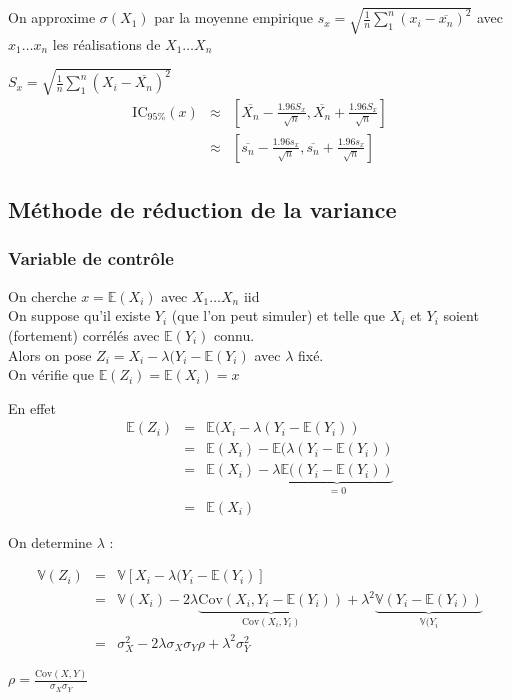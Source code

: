 \documentclass{report}
\newcommand{\Var}{\mathbb{V}}
\newcommand{\Cov}{\mathrm{Cov}}
\begin{document}
On approxime $\sigma(X_1)$ par la moyenne empirique $s_x = \sqrt{\displaystyle\frac{1}{n}\displaystyle\sum^n_1(x_i-\overline{x_n})^2}$ avec $x_1\dots x_n$ les réalisations de $X_1\dots X_n$

$S_x = \sqrt{\displaystyle\frac{1}{n}\displaystyle\sum^n_1(X_i-\overline{X_n})^2}$
\begin{eqnarray}
\mbox{IC}_{95\%}(x) &\approx& \left[\overline{X_n}-\displaystyle\frac{1.96S_x}{\sqrt{n}},\overline{X_n}+\displaystyle\frac{1.96S_x}{\sqrt{n}} \right]\nonumber\\
&\approx& \left[\overline{s_n}-\displaystyle\frac{1.96s_x}{\sqrt{n}},\overline{s_n}+\displaystyle\frac{1.96s_x}{\sqrt{n}} \right]\nonumber
\end{eqnarray}

\subsection{Méthode de réduction de la variance}
\subsubsection{Variable de contrôle}
On cherche $x= \mathbb{E}(X_i)$ avec $X_1\dots X_n$ iid\\
On suppose qu'il existe $Y_i$ (que l'on peut simuler) et telle que $X_i$ et $Y_i$ soient (fortement) corrélés avec $\mathbb{E}(Y_i)$ connu.\\
Alors on pose $Z_i = X_i - \lambda (Y_i-\mathbb{E}(Y_i)$ avec $\lambda$ fixé.\\
On vérifie que $\mathbb{E}(Z_i)=\mathbb{E}(X_i)=x$
\begin{description}
    \item En effet 
    \begin{eqnarray}
    \mathbb{E}(Z_i)&=&\mathbb{E}( X_i - \lambda (Y_i-\mathbb{E}(Y_i))\nonumber\\
    &=&\mathbb{E}(X_i) - \mathbb{E}(\lambda (Y_i-\mathbb{E}(Y_i))\nonumber \\
    &=& \mathbb{E}(X_i) - \lambda\underbrace{\mathbb{E}( (Y_i-\mathbb{E}(Y_i))}_{=0}\nonumber\\
    &=&\mathbb{E}(X_i)\nonumber
    \end{eqnarray}
\end{description}
On determine $\lambda$ : 

\begin{minipage}{0.75\textwidth}%
\begin{eqnarray}
\mathbb{V}(Z_i) &=& \mathbb{V}\left[ X_i - \lambda (Y_i-\mathbb{E}(Y_i)\right]\nonumber\\
&=&\mathbb{V}(X_i) - 2\lambda\underbrace{\Cov(X_i, Y_i-\mathbb{E}(Y_i))}_{\Cov(X_i, Y_i)}+\lambda^2\underbrace{\Var(Y_i-\mathbb{E}(Y_i))}_{\Var(Y_i}\nonumber\\
&=&\sigma^2_X - 2\lambda\sigma_X\sigma_Y\rho+\lambda^2\sigma_Y^2\nonumber
\end{eqnarray}
\end{minipage}%
\hfill
\begin{minipage}{0.35\textwidth}%
$\rho = \displaystyle\frac{\Cov(X,Y)}{\sigma_X\sigma_Y}$
\end{minipage}%
\end{document}
